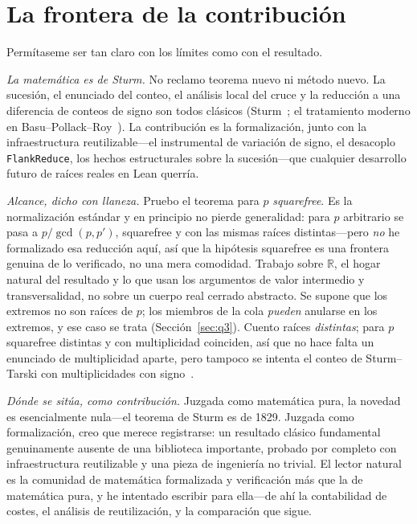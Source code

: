 \documentclass[11pt]{article}
\newcommand{\lean}[1]{\texttt{#1}}
\newcommand{\R}{\mathbb{R}}
\begin{document}
\section{La frontera de la contribuci\'on}\label{sec:boundary}

Permítaseme ser tan claro con los l\'imites como con el resultado.

\emph{La matem\'atica es de Sturm.} No reclamo teorema nuevo ni m\'etodo nuevo. La sucesi\'on, el
enunciado del conteo, el an\'alisis local del cruce y la reducci\'on a una diferencia de conteos de
signo son todos cl\'asicos (Sturm~\cite{sturm}; el tratamiento moderno en
Basu--Pollack--Roy~\cite{bpr}). La contribuci\'on es la formalizaci\'on, junto con la infraestructura
reutilizable---el instrumental de variaci\'on de signo, el desacoplo \lean{FlankReduce}, los hechos
estructurales sobre la sucesi\'on---que cualquier desarrollo futuro de ra\'ices reales en Lean
querr\'ia.

\emph{Alcance, dicho con llaneza.} Pruebo el teorema para $p$ \emph{squarefree}. Es la
normalizaci\'on est\'andar y en principio no pierde generalidad: para $p$ arbitrario se pasa a
$p/\gcd(p,p')$, squarefree y con las mismas ra\'ices distintas---pero \emph{no} he formalizado esa
reducci\'on aqu\'i, as\'i que la hip\'otesis squarefree es una frontera genuina de lo verificado, no
una mera comodidad. Trabajo sobre $\R$, el hogar natural del resultado y lo que usan los argumentos de
valor intermedio y transversalidad, no sobre un cuerpo real cerrado abstracto. Se supone que los
extremos no son ra\'ices de $p$; los miembros de la cola \emph{pueden} anularse en los extremos, y ese
caso se trata (Secci\'on~\ref{sec:q3}). Cuento ra\'ices \emph{distintas}; para $p$ squarefree distintas
y con multiplicidad coinciden, as\'i que no hace falta un enunciado de multiplicidad aparte, pero
tampoco se intenta el conteo de Sturm--Tarski con multiplicidades con signo~\cite{litarski,libudan}.

\emph{D\'onde se sit\'ua, como contribuci\'on.} Juzgada como matem\'atica pura, la novedad es
esencialmente nula---el teorema de Sturm es de 1829. Juzgada como formalizaci\'on, creo que merece
registrarse: un resultado cl\'asico fundamental genuinamente ausente de una biblioteca importante,
probado por completo con infraestructura reutilizable y una pieza de ingenier\'ia no trivial. El
lector natural es la comunidad de matem\'atica formalizada y verificaci\'on m\'as que la de
matem\'atica pura, y he intentado escribir para ella---de ah\'i la contabilidad de costes, el
an\'alisis de reutilizaci\'on, y la comparaci\'on que sigue.
\end{document}
